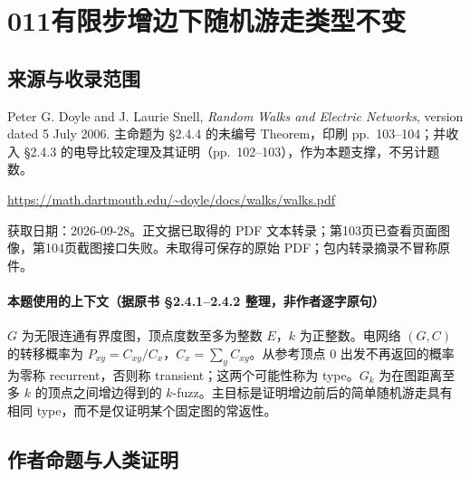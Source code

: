 \documentclass[UTF8,11pt]{ctexart}
\theoremstyle{definition}
\begin{document}
\section*{011\quad 有限步增边下随机游走类型不变}
\subsection*{来源与收录范围}
Peter G. Doyle and J. Laurie Snell, \emph{Random Walks and Electric Networks}, version dated 5 July 2006. 主命题为 \S2.4.4 的未编号 Theorem，印刷 pp.~103--104；并收入 \S2.4.3 的电导比较定理及其证明（pp.~102--103），作为本题支撑，不另计题数。
\par\url{https://math.dartmouth.edu/~doyle/docs/walks/walks.pdf}
\par 获取日期：2026-09-28。正文据已取得的 PDF 文本转录；第103页已查看页面图像，第104页截图接口失败。未取得可保存的原始 PDF；包内转录摘录不冒称原件。
\paragraph{本题使用的上下文（据原书 \S2.4.1--2.4.2 整理，非作者逐字原句）}
$G$ 为无限连通有界度图，顶点度数至多为整数 $E$，$k$ 为正整数。电网络 $(G,C)$ 的转移概率为 $P_{xy}=C_{xy}/C_x$，$C_x=\sum_y C_{xy}$。从参考顶点 $0$ 出发不再返回的概率为零称 recurrent，否则称 transient；这两个可能性称为 type。$G_k$ 为在图距离至多 $k$ 的顶点之间增边得到的 $k$-fuzz。主目标是证明增边前后的简单随机游走具有相同 type，而不是仅证明某个固定图的常返性。
\subsection*{作者命题与人类证明}
\end{document}
